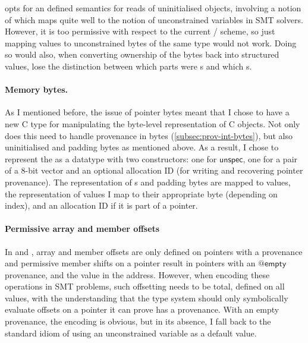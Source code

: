  opts for an defined semantics for reads of uninitialised objects,
involving a notion of  which maps quite well to
the notion of unconstrained variables in SMT solvers. However, it is too
permissive with respect to the current /
scheme, so just mapping  values to unconstrained
 bytes of the same type would not work. Doing so would also,
when converting ownership of the bytes back into structured values, lose the
distinction between which parts were s and which
s.

\paragraph{Memory bytes.}%
As I mentioned before, the issue of pointer bytes meant that I chose to have a
new C type for manipulating the byte-level representation of C objects. Not
only does this need to handle provenance in bytes
(\cref{subsec:prov-int-bytes}), but also uninitialised and padding bytes as
mentioned above. As a result, I chose to represent the  as
a datatype with two constructors: one for $\mathsf{unspec}$, one for a pair of
a 8-bit vector and an optional allocation ID (for writing and recovering
pointer provenance). The representation of s and padding bytes
are mapped to  values, the representation of 
values I map to their appropriate byte (depending on
index), and an allocation ID if it is part of a pointer.

\paragraph{Permissive array and member offsets}%
In  and , array and member offsets are only defined on
pointers with a provenance and permissive member shifts on a 
pointer result in pointers with an $@\mathsf{empty}$ provenance, and the
 value in the address. However, when encoding these
operations in SMT problems, such offsetting needs to be total, defined on all
values, with the understanding that the type system should only symbolically
evaluate offsets on a pointer it can prove has a provenance. With an empty
provenance, the encoding is obvious, but in its absence, I fall back to the
standard idiom of using an unconstrained variable as a default value.


